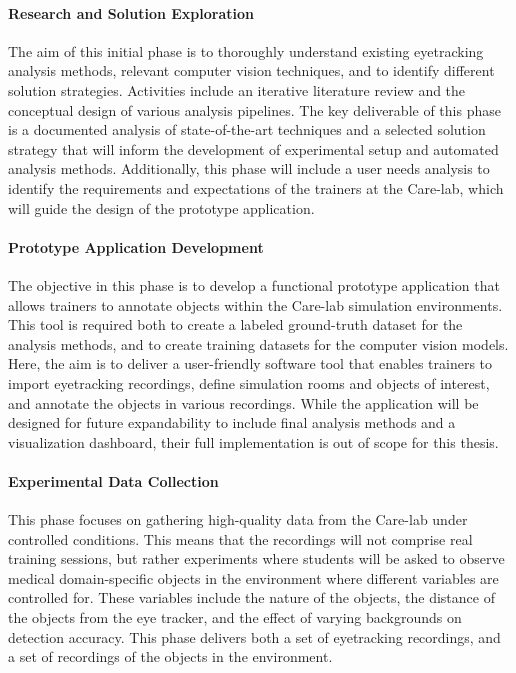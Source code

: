 \documentclass[english]{hogent-article}
\begin{document}
\paragraph{Research and Solution Exploration\\}
The aim of this initial phase is to thoroughly understand existing eyetracking analysis methods, 
relevant computer vision techniques, and to identify different solution strategies. 
Activities include an iterative literature review and the conceptual design of various analysis pipelines.
The key deliverable of this phase is a documented analysis of state-of-the-art techniques and a selected solution strategy 
that will inform the development of experimental setup and automated analysis methods.
Additionally, this phase will include a user needs analysis to identify the requirements and expectations of the trainers at the Care-lab, 
which will guide the design of the prototype application.

\paragraph{Prototype Application Development\\}
The objective in this phase is to develop a functional prototype application that allows trainers to annotate objects within the Care-lab simulation environments.
This tool is required both to create a labeled ground-truth dataset for the analysis methods, and to create training datasets for the computer vision models.
Here, the aim is to deliver a user-friendly software tool that enables trainers to import eyetracking recordings, define simulation rooms and objects of interest, and annotate the objects in various recordings.
While the application will be designed for future expandability to include final analysis methods and a visualization dashboard, their full implementation is out of scope for this thesis.

\paragraph{Experimental Data Collection\\}
This phase focuses on gathering high-quality data from the Care-lab under controlled conditions. 
This means that the recordings will not comprise real training sessions, but rather experiments where students will be asked to observe medical 
domain-specific objects in the environment where different variables are controlled for.
These variables include the nature of the objects, the distance of the objects from the eye tracker, and the effect of varying backgrounds on detection accuracy.
This phase delivers both a set of eyetracking recordings, and a set of recordings of the objects in the environment.
\end{document}
